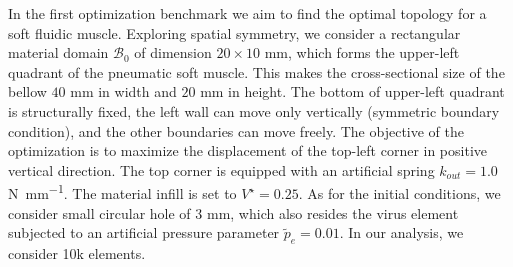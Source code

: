 In the first optimization benchmark we aim to find the optimal topology for a soft fluidic muscle. Exploring spatial symmetry, we consider a rectangular material domain $\mathcal{B}_0$ of dimension $20 \times 10$ \si{\milli \meter}, which forms the upper-left quadrant of the pneumatic soft muscle. This makes the cross-sectional size of the bellow $40$ \si{\milli \meter} in width and $20$ \si{\milli \meter} in height. The bottom of upper-left quadrant is structurally fixed, the left wall can move only vertically (symmetric boundary condition), and the other boundaries can move freely. The objective of the optimization is to maximize the displacement of the top-left corner in positive vertical direction. The top corner is equipped with an artificial spring $k_{out} = 1.0$ \si{\newton \per \milli \meter}. The material infill is set to $V^\star = 0.25$. As for the initial conditions, we consider small circular hole of $3$ \si{\milli \meter}, which also resides the virus element subjected to an artificial pressure parameter $\tilde{p}_e = 0.01$. In our analysis, we consider 10k elements.
%

